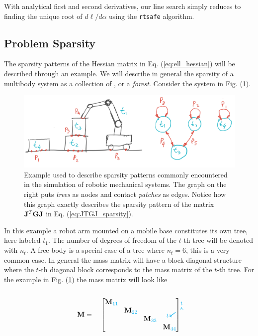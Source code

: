 With analytical first and second derivatives, our line search simply reduces to
finding the unique root of $d\ell/d\alpha$ using the \verb;rtsafe; algorithm.

\subsection{Problem Sparsity}

The sparsity patterns of the Hessian matrix in Eq. (\ref{eq:ell_hessian}) will
be described through an example. We will describe in general the sparsity of a
multibody system as a collection of , or a
\textit{forest}. Consider the system in Fig. (\ref{fig:sparsity_example}).
\begin{figure}[!h]
	\centering
	\includegraphics[width=0.7\columnwidth]{figures/sparsity_example.png}
	\caption{\label{fig:sparsity_example} 
	Example used to describe sparsity patterns commonly encountered in the
	simulation of robotic mechanical systems. The graph on the right puts
	\textit{trees} as nodes and contact \textit{patches} as edges. Notice how
	this graph exactly describes the sparsity pattern of the matrix
	${\mathbf{J}}^T{\mathbf{G}}{\mathbf{J}}$ in Eq. (\ref{eq:JTGJ_sparsity}).}
\end{figure}
In this example a robot arm mounted on a mobile base constitutes its own tree,
here labeled $t_1$. The number of degrees of freedom of the $t\text{-th}$ tree
will be denoted with $n_t$. A free body is a special case of a tree where
$n_t=6$, this is a very common case. In general the mass matrix will have a
block diagonal structure where the $t\text{-th}$ diagonal block corresponds to
the mass matrix of the $t\text{-th}$ tree. For the example in Fig.
(\ref{fig:sparsity_example}) the mass matrix will look like\\\\
\begin{equation}
	\mf{M}=\quad
	\begin{bmatrix}
		\tikzmark{M_topleft}
		\diagentry{\mf{M}_{\cc{11}}}&&&\tikzmark{M_topright}\\
		&\diagentry{\mf{M}_{\cc{22}}}\\
		&&\diagentry{\mf{M}_{\cc{33}}}\\		
		\tikzmark{M_bottomleft}&&&\diagentry{\mf{M}_{\cc{44}}}
	\end{bmatrix}
\tikz[overlay,remember picture] {
	\draw[->,thick,color=cyan]
  ([yshift=3ex]M_topleft) -- ([yshift=3ex]M_topright) node[midway,above]
  {\scriptsize $t$}; 
  \draw[->,thick,color=cyan]
  ([yshift=1.5ex,xshift=-2ex]M_topleft) -- ([xshift=-4ex]M_bottomleft)
  node[near end,left] {\scriptsize $t$};}	
\end{equation}

